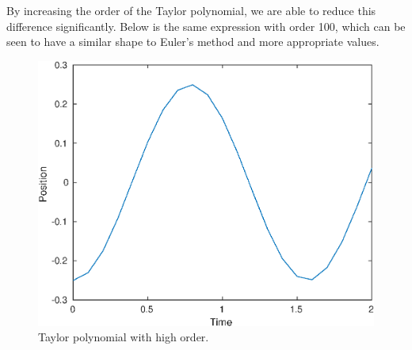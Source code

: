 By increasing the order of the Taylor polynomial, we are able to reduce this difference significantly.
Below is the same expression with order 100, which can be seen to have a similar shape to Euler's method and more appropriate values.
\begin{figure}[h]
    \centering
    \includegraphics[scale=0.65, center]{eps/topic8_c.eps}
    \caption{Taylor polynomial with high order.}
    \label{fig:taylorOrder100}
\end{figure}
